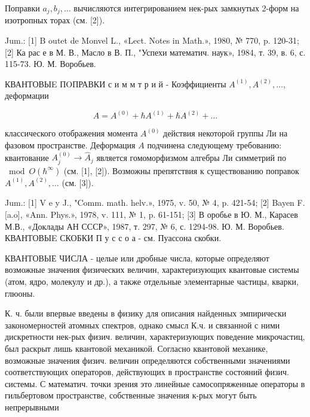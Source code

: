 \documentclass[10pt]{article}
\begin{document}
Поправки $a_{j}, b_{j}, \ldots$ вычисляются интегрированием нек-рых замкнутых 2-форм на изотропных торах (см. [2]).



Jum.: [1] B outet de Monvel L., «Lect. Notes in Math.», 1980, № 770, p. 120-31; [2] Ка рас е в М. В., Масло в В. П., "Успехи математич. наук», 1984, т. 39, в. 6, с. 115-73. Ю. М. Воробьев.



КВАНТОВЫE ПOПРАВКИ с и м м т р и й - Коэффициенты $A^{(1)}, A^{(2)}, \ldots$, деформации



\[

A=A^{(0)}+\hbar A^{(1)}+\hbar A^{(2)}+\ldots

\]



классического отображения момента $A^{(0)}$ действия некоторой группы Ли на фазовом пространстве. Деформация $A$ подчинена следующему требованию: квантование $A_{j}^{(0)} \rightarrow \hat{A}_{j}$ является гомоморфизмом алгебры Ли симметрий по $\bmod O\left(\hbar^{\infty}\right)$ (см. [1], [2]). Возможны препятствия к существованию поправок $A^{(1)}, A^{(2)}, \ldots$ (см. [3]).



Jum.: [1] V e y J., "Comm. math. helv.», 1975, v. 50, № 4, p. 421-54; [2] Bayen F. [a.o], «Ann. Phys.», 1978, v. 111, № 1, p. 61-151; [3] В оробье в Ю. М., Карасев М.В., «Доклады АН СССР», 1987, т. 297, № 6, с. 1294-98. Ю. М. Воробьев. КВАНТОВЫE СКОБКИ П у с с о а - см. Пуассона скобки.



КВАНТОВЫЕ ЧИСЛА - целые или дробные числа, которые определяют возможные значения физических величин, характеризующих квантовые системы (атом, ядро, молекулу и др.), а также отдельные элементарные частицы, кварки, глюоны.



К. ч. были впервые введены в физику для описания найденных эмпирически закономерностей атомных спектров, однако смысл К.ч. и связанной с ними дискретности нек-рых физич. величин, характеризующих поведение микрочастиц, был раскрыт лишь квантовой механикой. Согласно квантовой механике, возможные значения физич. величин определяются собственными значениями соответствующих операторов, действующих в пространстве состояний физич. системы. С математич. точки зрения это линейные самосопряженные операторы в гильбертовом пространстве, собственные значения к-рых могут быть непрерывными
\end{document}
